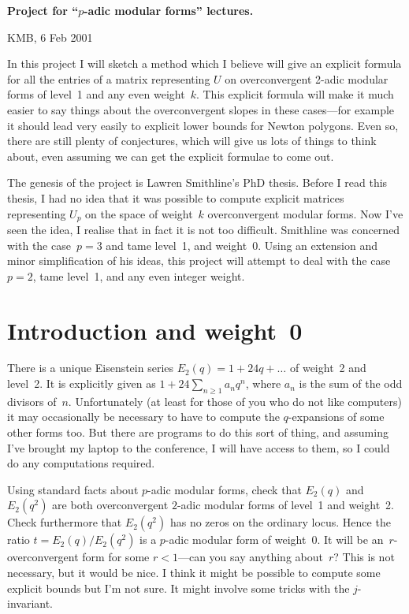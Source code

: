 \documentclass{article}
\begin{document}
\begin{center}
{\Large\bfseries Project for ``$p$-adic modular forms'' lectures.}
\end{center}
\begin{flushright}
KMB, 6 Feb 2001
\end{flushright}
\bigskip
In this project I will sketch a method which I believe will give an
explicit formula for all the entries of a matrix representing
$U$ on overconvergent 2-adic modular forms of level~1 and
any even weight~$k$. This explicit formula will make it much easier
to say things about the overconvergent slopes in these cases---for
example it should lead very easily to explicit lower bounds for
Newton polygons. Even so, there are still plenty of conjectures, which will
give us lots of things to think about, even assuming we can get the
explicit formulae to come out.

\medskip

The genesis of the project is Lawren Smithline's PhD thesis. Before I read
this thesis, I had no idea that it was possible to compute explicit
matrices representing $U_p$ on the space of weight~$k$ overconvergent
modular forms. Now I've seen the idea, I realise that in fact it is not
too difficult. Smithline was concerned with the case~$p=3$ and tame level~1,
and weight~0. Using an extension and minor simplification of his ideas,
this project will attempt to deal with the case~$p=2$, tame level~1, and any
even integer weight.

\section*{Introduction and weight~0}

There is a unique Eisenstein series $E_2(q)=1+24q+\ldots$ of weight~2 and
level~2. It is explicitly given as $1+24\sum_{n\geq1}a_nq^n$,
where $a_n$ is the sum of the odd divisors of~$n$.
Unfortunately (at least for those of you who do not like computers)
it may occasionally be necessary to have to compute the $q$-expansions of
some other forms too. But there are programs to do this sort of thing,
and assuming I've brought my laptop to the conference, I will have
access to them, so I could do any computations required.

Using standard facts about $p$-adic modular forms, check that
$E_2(q)$ and $E_2(q^2)$ are both overconvergent $2$-adic modular
forms of level~1 and weight~2. Check furthermore that $E_2(q^2)$
has no zeros on the ordinary locus. Hence the ratio $t=E_2(q)/E_2(q^2)$
is a $p$-adic modular form of weight~0. It will be an~$r$-overconvergent
form for some $r<1$---can you say anything about~$r$? This is not
necessary, but it would be nice. I think it might be possible
to compute some explicit bounds but I'm not sure. It might involve
some tricks with the $j$-invariant.
\end{document}
